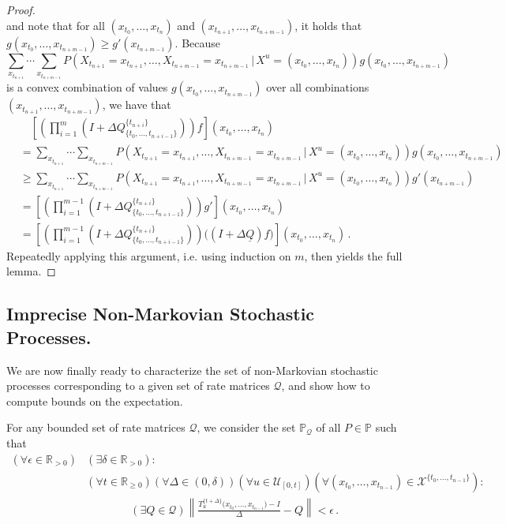 \documentclass[a4paper,reqno]{amsart}
\newcommand{\reals}{\mathbb{R}}
\newcommand{\realspos}{\reals_{>0}}
\newcommand{\realsnonneg}{\reals_{\geq 0}}
\newcommand{\states}{\mathcal{X}}
\newcommand{\lrate}{\underline{Q}}
\newcommand{\norm}[1]{\left\lVert #1 \right\rVert}
\begin{document}
\begin{proof}
\begin{equation*}
\end{equation*}
and note that for all $(x_{t_0},\ldots,x_{t_n})$ and $(x_{t_{n+1}},\ldots,x_{t_{n+m-1}})$, it holds that $g(x_{t_0},\ldots,x_{t_{n+m-1}}) \geq g'(x_{t_{n+m-1}})$.
Because
\begin{equation*}
\sum_{x_{t_{n+1}}}\cdots\sum_{x_{t_{n+m-1}}} P\left(X_{t_{n+1}}=x_{t_{n+1}},\ldots,X_{t_{n+m-1}}=x_{t_{n+m-1}}\,\vert\,X^u=(x_{t_0},\ldots,x_{t_n})\right)g(x_{t_0},\ldots,x_{t_{n+m-1}})
\end{equation*}
is a convex combination of values $g(x_{t_0},\ldots,x_{t_{n+m-1}})$ over all combinations $(x_{t_{n+1}},\ldots,x_{t_{n+m-1}})$, we have that
\begin{align*}
&\quad \left[\left(\prod_{i=1}^m \left(I + \Delta Q_{\{t_0,\ldots,t_{n+i-1}\}}^{\{t_{n+i}\}} \right)\right)f\right](x_{t_0},\ldots,x_{t_n}) \\
&= \sum_{x_{t_{n+1}}}\cdots\sum_{x_{t_{n+m-1}}} P\left(X_{t_{n+1}}=x_{t_{n+1}},\ldots,X_{t_{n+m-1}}=x_{t_{n+m-1}}\,\vert\,X^u=(x_{t_0},\ldots,x_{t_n})\right)g(x_{t_0},\ldots,x_{t_{n+m-1}}) \\
&\geq \sum_{x_{t_{n+1}}}\cdots\sum_{x_{t_{n+m-1}}} P\left(X_{t_{n+1}}=x_{t_{n+1}},\ldots,X_{t_{n+m-1}}=x_{t_{n+m-1}}\,\vert\,X^u=(x_{t_0},\ldots,x_{t_n})\right)g'(x_{t_{n+m-1}}) \\
&= \left[\left(\prod_{i=1}^{m-1} \left(I + \Delta Q_{\{t_0,\ldots,t_{n+i-1}\}}^{\{t_{n+i}\}} \right)\right)g'\right](x_{t_0},\ldots,x_{t_n}) \\
&= \left[\left(\prod_{i=1}^{m-1} \left(I + \Delta Q_{\{t_0,\ldots,t_{n+i-1}\}}^{\{t_{n+i}\}} \right)\right)\bigl(\left(I + \Delta\lrate\right)f\bigr)\right](x_{t_0},\ldots,x_{t_n})\,.
\end{align*}
Repeatedly applying this argument, i.e. using induction on $m$, then yields the full lemma.
\end{proof}

\subsection{Imprecise Non-Markovian Stochastic Processes.} We are now finally ready to characterize the set of non-Markovian stochastic processes corresponding to a given set of rate matrices $\mathcal{Q}$, and show how to compute bounds on the expectation.

For any bounded set of rate matrices $\mathcal{Q}$, we consider the set $\mathbb{P}_\mathcal{Q}$ of all $P\in\mathbb{P}$ such that
\newline
\begin{align*}
(\forall \epsilon\in\realspos)&(\exists \delta\in\realspos): \\
&(\forall t\in\realsnonneg)(\forall \Delta\in(0,\delta))(\forall u\in\mathcal{U}_{[0,t]})(\forall (x_{t_0},\ldots,x_{t_{n-1}})\in\states^{\{t_0,\ldots,t_{n-1}\}}): \\
&\quad\quad\quad\quad(\exists Q\in\mathcal{Q})\norm{\frac{T_u^{\{t+\Delta\}}\bigl(x_{t_0},\ldots,x_{t_{n-1}}\bigr) - I}{\Delta} - Q} < \epsilon\,.
\end{align*}
\end{document}
